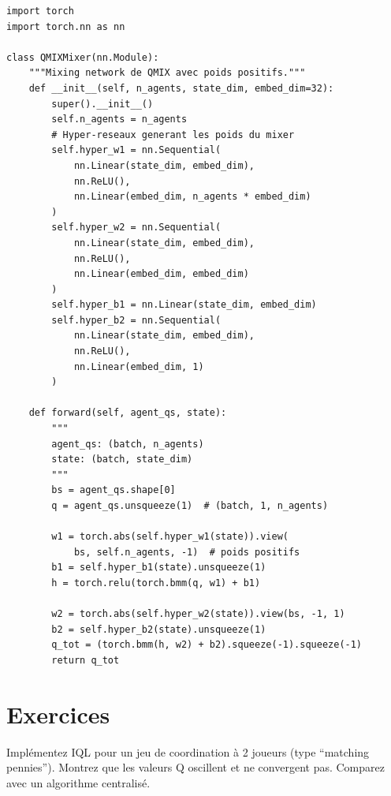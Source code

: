 \begin{codeblock}[title=\textbf{QMIX --- R\'eseau de m\'elange}]
\begin{verbatim}
import torch
import torch.nn as nn

class QMIXMixer(nn.Module):
    """Mixing network de QMIX avec poids positifs."""
    def __init__(self, n_agents, state_dim, embed_dim=32):
        super().__init__()
        self.n_agents = n_agents
        # Hyper-reseaux generant les poids du mixer
        self.hyper_w1 = nn.Sequential(
            nn.Linear(state_dim, embed_dim),
            nn.ReLU(),
            nn.Linear(embed_dim, n_agents * embed_dim)
        )
        self.hyper_w2 = nn.Sequential(
            nn.Linear(state_dim, embed_dim),
            nn.ReLU(),
            nn.Linear(embed_dim, embed_dim)
        )
        self.hyper_b1 = nn.Linear(state_dim, embed_dim)
        self.hyper_b2 = nn.Sequential(
            nn.Linear(state_dim, embed_dim),
            nn.ReLU(),
            nn.Linear(embed_dim, 1)
        )

    def forward(self, agent_qs, state):
        """
        agent_qs: (batch, n_agents)
        state: (batch, state_dim)
        """
        bs = agent_qs.shape[0]
        q = agent_qs.unsqueeze(1)  # (batch, 1, n_agents)

        w1 = torch.abs(self.hyper_w1(state)).view(
            bs, self.n_agents, -1)  # poids positifs
        b1 = self.hyper_b1(state).unsqueeze(1)
        h = torch.relu(torch.bmm(q, w1) + b1)

        w2 = torch.abs(self.hyper_w2(state)).view(bs, -1, 1)
        b2 = self.hyper_b2(state).unsqueeze(1)
        q_tot = (torch.bmm(h, w2) + b2).squeeze(-1).squeeze(-1)
        return q_tot
\end{verbatim}
\end{codeblock}

\section{Exercices}

\begin{exercice}
Impl\'ementez IQL pour un jeu de coordination \`a 2 joueurs (type ``matching pennies'').
Montrez que les valeurs Q oscillent et ne convergent pas. Comparez avec un
algorithme centralis\'e.
\end{exercice}

